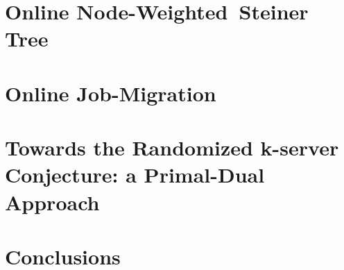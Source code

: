 \documentclass[10pt, twocolumn]{article}
\begin{document}
\section{Online \mbox{Node-Weighted Steiner} Tree}
\label{steiner-tree}


\section{Online Job-Migration}
\label{job-migration}


\section{Towards the Randomized k-server Conjecture: a Primal-Dual Approach}
\label{k-server}


\section{Conclusions}



\end{document}
